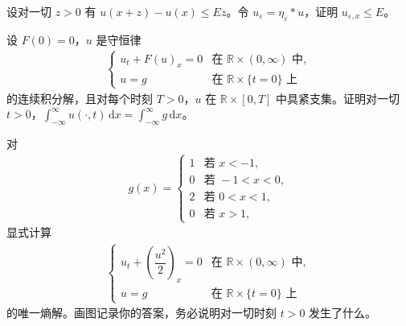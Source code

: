 \documentclass[../../main.tex]{subfiles}
\begin{document}
\begin{exercise}\label{exercise:ch03-18}
设对一切 $z>0$ 有 $u(x+z)-u(x)\leqslant Ez$。令 $u_\varepsilon=\eta_\varepsilon*u$，证明 $u_{\varepsilon,x}\leqslant E$。
\end{exercise}

\begin{exercise}\label{exercise:ch03-19}
设 $F(0)=0$，$u$ 是守恒律
\begin{align*}
\begin{cases}
u_t+F(u)_x=0 & \text{在 }\mathbb{R}\times(0,\infty)\text{ 中},\\
u=g & \text{在 }\mathbb{R}\times\{t=0\}\text{ 上}
\end{cases}
\end{align*}
的连续积分解，且对每个时刻 $T>0$，$u$ 在 $\mathbb{R}\times[0,T]$ 中具紧支集。证明对一切 $t>0$，$\int_{-\infty}^{\infty}u(\cdot,t)\,\mathrm{d}x=\int_{-\infty}^{\infty}g\,\mathrm{d}x$。
\end{exercise}

\begin{exercise}\label{exercise:ch03-20}
对
\begin{align*}
g(x)=
\begin{cases}
1 & \text{若 }x<-1,\\
0 & \text{若 }-1<x<0,\\
2 & \text{若 }0<x<1,\\
0 & \text{若 }x>1,
\end{cases}
\end{align*}
显式计算
\begin{align*}
\begin{cases}
u_t+\left(\dfrac{u^2}{2}\right)_x=0 & \text{在 }\mathbb{R}\times(0,\infty)\text{ 中},\\
u=g & \text{在 }\mathbb{R}\times\{t=0\}\text{ 上}
\end{cases}
\end{align*}
的唯一熵解。画图记录你的答案，务必说明对一切时刻 $t>0$ 发生了什么。
\end{exercise}
\end{document}
